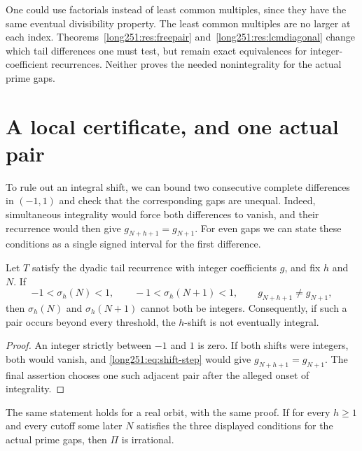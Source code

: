 \documentclass[11pt]{article}
\makeatletter
\newcommand{\compatlabel}[1]{\ltx@label{#1}}
\makeatother
\begin{document}
One could use factorials instead of least common multiples, since they
have the same eventual divisibility property.  The least common multiples
are no larger at each index.  Theorems~\ref{long251:res:freepair}
and~\ref{long251:res:lcmdiagonal} change which tail differences one must
test, but remain exact equivalences for integer-coefficient recurrences.
Neither proves the needed nonintegrality for the actual prime gaps.

\section{A local certificate, and one actual pair}\label{long251:sec:local-certificate}

To rule out an integral shift, we can bound two consecutive complete
differences in $(-1,1)$ and check that the corresponding gaps are unequal.
Indeed, simultaneous integrality would force both differences to vanish,
and their recurrence would then give $g_{N+h+1}=g_{N+1}$.
For even gaps we can state these conditions as a single signed interval
for the first difference.

\begin{theorem}\label{long251:res:smallpair}\compatlabel{res:smallpair}
Let $T$ satisfy the dyadic tail recurrence with integer coefficients $g$, and fix
$h$ and $N$.  If
\[
 -1<\sigma_h(N)<1,\qquad -1<\sigma_h(N+1)<1,
 \qquad g_{N+h+1}\ne g_{N+1},
\]
then $\sigma_h(N)$ and $\sigma_h(N+1)$ cannot both be integers.  Consequently,
if such a pair occurs beyond every threshold, the $h$-shift is not eventually
integral.
\end{theorem}

\begin{proof}
An integer strictly between $-1$ and $1$ is zero.  If both shifts were
integers, both would vanish, and \eqref{long251:eq:shift-step} would give
$g_{N+h+1}=g_{N+1}$.  The final assertion chooses one such adjacent pair
after the alleged onset of integrality.
\end{proof}

\begin{corollary}\label{long251:res:smallpair-real}\compatlabel{res:smallpair-real}
The same statement holds for a real orbit, with the same proof.  If for every
$h\ge1$ and every cutoff some later $N$ satisfies the three displayed
conditions for the actual prime gaps, then $\Pi$ is irrational.
\end{corollary}
\end{document}

